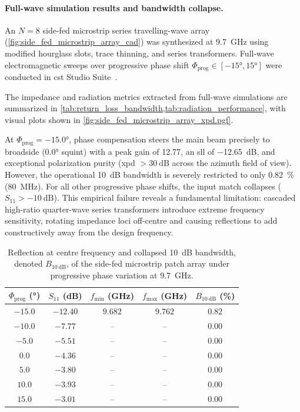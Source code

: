 \paragraph{Full-wave simulation results and bandwidth collapse.}
An $N = 8$ side-fed microstrip series travelling-wave array (\cref{fig:side_fed_microstrip_array_cad}) was synthesized at \qty{9.7}{\giga\hertz} using modified hourglass slots, trace thinning, and series transformers.
Full-wave electromagnetic sweeps over progressive phase shift $\Phi_{\mathrm{prog}} \in [\ang{-15}, \ang{15}]$ were conducted in \gls{cst} Studio Suite~\parencite{cstStudioSuite2026}.

The impedance and radiation metrics extracted from full-wave simulations are summarized in \cref{tab:return_loss_bandwidth,tab:radiation_performance}, with visual plots shown in \cref{fig:side_fed_microstrip_array_xpd.pgf}.

At $\Phi_{\mathrm{prog}} = \ang{-15.0}$, phase compensation steers the main beam precisely to broadside (\ang{0.0} squint) with a peak gain of \qty{12.77}{\dBi}, an \gls{sll} of \qty{-12.65}{\dB}, and exceptional polarization purity (\gls{xpd} $> \qty{30}{\dB}$ across the azimuth field of view).
However, the operational \qty{10}{\dB} bandwidth is severely restricted to only \qty{0.82}{\percent} (\qty{80}{\mega\hertz}).
For all other progressive phase shifts, the input match collapses ($S_{11} > \qty{-10}{\dB}$).
This empirical failure reveals a fundamental limitation: cascaded high-ratio quarter-wave series transformers introduce extreme frequency sensitivity, rotating impedance loci off-centre and causing reflections to add constructively away from the design frequency.

\begin{table}[p]
    \centering
    \caption{Reflection at centre frequency and collapsed \qty{10}{\dB} bandwidth, denoted $B_{\qty{10}{\dB}}$, of the side-fed microstrip patch array under progressive phase variation at \qty{9.7}{\giga\hertz}.}
    \label{tab:return_loss_bandwidth}
    \small
    \begin{tabular}{ccccc}
        \toprule
        $\Phi_{\mathrm{prog}}$ (\unit{\degree}) & $S_{11}$ (dB) & $f_{\mathrm{min}}$ (GHz) & $f_{\mathrm{max}}$ (GHz) & $B_{\qty{10}{\dB}}$ (\%) \\
        \midrule
        $-15.0$ & $-12.40$ & $9.682$ & $9.762$ & $0.82$ \\
        $-10.0$ & $-7.77$  & -- & -- & $0.00$ \\
        $-5.0$  & $-5.51$  & -- & -- & $0.00$ \\
        $0.0$   & $-4.36$  & -- & -- & $0.00$ \\
        $5.0$   & $-3.80$  & -- & -- & $0.00$ \\
        $10.0$  & $-3.93$  & -- & -- & $0.00$ \\
        $15.0$  & $-3.01$  & -- & -- & $0.00$ \\
        \bottomrule
    \end{tabular}
\end{table}

